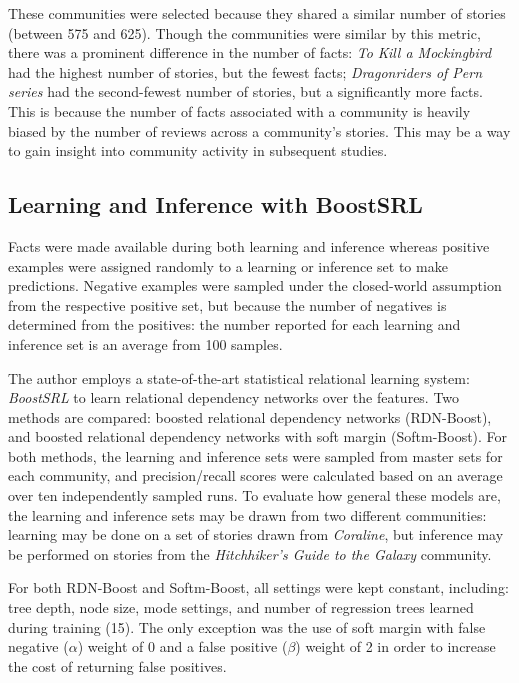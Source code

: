 \documentclass[letterpaper]{article}
\begin{document}
These communities were selected because they shared a similar number of stories (between 575 and 625). Though the communities were similar by this metric, there was a prominent difference in the number of facts: \textit{To Kill a Mockingbird} had the highest number of stories, but the fewest facts; \textit{Dragonriders of Pern series} had the second-fewest number of stories, but a significantly more facts. This is because the number of facts associated with a community is heavily biased by the number of reviews across a community's stories. This may be a way to gain insight into community activity in subsequent studies.

\subsection{Learning and Inference with BoostSRL}

Facts were made available during both learning and inference whereas positive examples were assigned randomly to a learning or inference set to make predictions.  Negative examples were sampled under the closed-world assumption from the respective positive set, but because the number of negatives is determined from the positives: the number reported for each learning and inference set is an average from 100 samples.

The author employs a state-of-the-art statistical relational learning system: \textit{BoostSRL} to learn relational dependency networks over the features. Two methods are compared: boosted relational dependency networks (RDN-Boost), and boosted relational dependency networks with soft margin (Softm-Boost). For both methods, the learning and inference sets were sampled from master sets for each community, and precision/recall scores were calculated based on an average over ten independently sampled runs. To evaluate how general these models are, the learning and inference sets may be drawn from two different communities: learning may be done on a set of stories drawn from \textit{Coraline}, but inference may be performed on stories from the \textit{Hitchhiker's Guide to the Galaxy} community.

For both RDN-Boost and Softm-Boost, all settings were kept constant, including: tree depth, node size, mode settings, and number of regression trees learned during training (15). The only exception was the use of soft margin with false negative ($\alpha$) weight of 0 and a false positive ($\beta$) weight of 2 in order to increase the cost of returning false positives.
\end{document}
